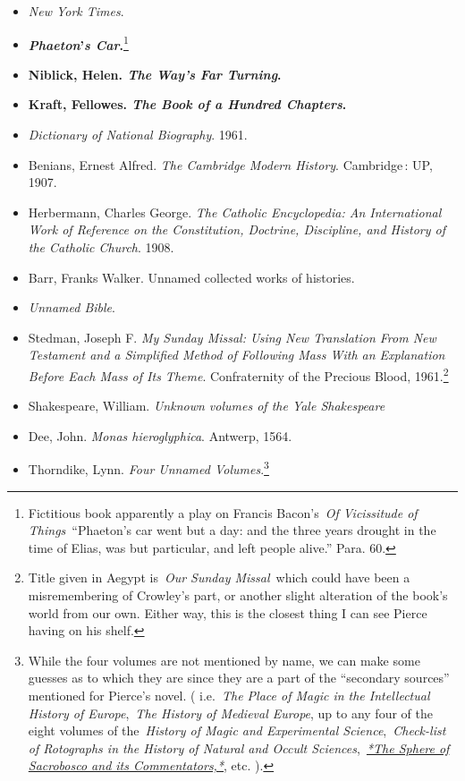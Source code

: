 \documentclass[12pt]{article}
\providecommand{\tightlist}{%
  \setlength{\itemsep}{0pt}\setlength{\parskip}{0pt}}
\begin{document}
\begin{itemize}
\tightlist
\item
  \emph{New York Times}.
\item
  \textbf{\emph{Phaeton}'\emph{s Car}.}\footnote{Fictitious book apparently a play on Francis Bacon's~\emph{Of Vicissitude of Things}~``Phaeton's car went but a day: and the three years drought in the time of Elias, was but particular, and left people alive.'' Para. 60.}
\item
  \textbf{Niblick, Helen. \emph{The Way's Far Turning}.}
\item
  \textbf{Kraft, Fellowes. \emph{The Book of a Hundred Chapters}.}
\item
  \emph{Dictionary of National Biography}. 1961.
\item
  Benians, Ernest Alfred. \emph{The Cambridge Modern History}. Cambridge\,: UP, 1907.
\item
  Herbermann, Charles George. \emph{The Catholic Encyclopedia: An International Work of Reference on the Constitution, Doctrine, Discipline, and History of the Catholic Church}. 1908.
\item
  Barr, Franks Walker. Unnamed collected works of histories.
\item
  \emph{Unnamed Bible}.
\item
  Stedman, Joseph F. \emph{My Sunday Missal: Using New Translation From New Testament and a Simplified Method of Following Mass With an Explanation Before Each Mass of Its Theme}. Confraternity of the Precious Blood, 1961.\footnote{Title given in Aegypt is~\emph{Our Sunday Missal}~which could have been a misremembering of Crowley's part, or another slight alteration of the book's world from our own. Either way, this is the closest thing I can see Pierce having on his shelf.}
\item
  Shakespeare, William. \emph{Unknown volumes of the Yale Shakespeare}
\item
  Dee, John. \emph{Monas hieroglyphica}. Antwerp, 1564.
\item
  Thorndike, Lynn. \emph{Four Unnamed Volumes}.\footnote{While the four volumes are not mentioned by name, we can make some guesses as to which they are since they are a part of the ``secondary sources'' mentioned for Pierce's novel. ( i.e.~\emph{The Place of Magic in the Intellectual History of Europe},~\emph{The History of Medieval Europe}, up to any four of the eight volumes of the~\emph{History of Magic and Experimental Science},~\emph{Check-list of Rotographs in the History of Natural and Occult Sciences},~\emph{\href{http://hdl.handle.net/2027/mdp.39015025028716}{*The Sphere of Sacrobosco and its Commentators,*}}, etc. ).}

\end{itemize}
\end{document}
